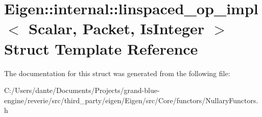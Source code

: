 \hypertarget{struct_eigen_1_1internal_1_1linspaced__op__impl}{}\section{Eigen\+::internal\+::linspaced\+\_\+op\+\_\+impl$<$ Scalar, Packet, Is\+Integer $>$ Struct Template Reference}
\label{struct_eigen_1_1internal_1_1linspaced__op__impl}


The documentation for this struct was generated from the following file\+:\begin{DoxyCompactItemize}
\item 
C\+:/\+Users/dante/\+Documents/\+Projects/grand-\/blue-\/engine/reverie/src/third\+\_\+party/eigen/\+Eigen/src/\+Core/functors/Nullary\+Functors.\+h\end{DoxyCompactItemize}
